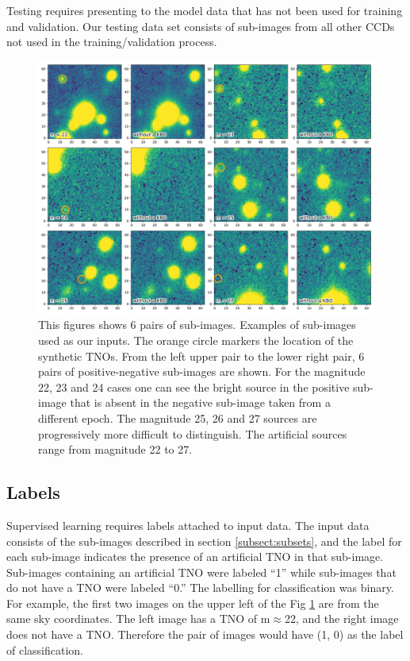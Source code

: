 \documentclass{aastex631}
\begin{document}
Testing requires presenting to the model data that has not been used for training and validation. Our testing data set consists of sub-images from all other CCDs not used in the training/validation process. 

\begin{figure}[ht]
    \centering
    \includegraphics[width=\textwidth,keepaspectratio]{Figures/mag_examples.png}
    \caption{This figures shows 6 pairs of sub-images.
    Examples of sub-images used as our inputs. 
    The orange circle markers the location of the synthetic TNOs.
    From the left upper pair to the lower right pair, 6 pairs of positive-negative sub-images are shown.
    For the magnitude 22, 23 and 24 cases one can see the bright source in the positive sub-image that is absent in the negative sub-image taken from a different epoch.
    The magnitude 25, 26 and 27 sources are progressively more difficult to distinguish. 
    The artificial sources range from magnitude 22 to 27.}
    \label{fig:magexamples}
\end{figure}{}

\subsection{Labels}
\label{subsect:labeling}
Supervised learning requires labels attached to input data. 
The input data consists of the sub-images described in section \ref{subsect:subsets}, and the label for each sub-image indicates the presence of an artificial TNO in that sub-image.  
Sub-images containing an artificial TNO were labeled ``1'' while sub-images that do not have a TNO were labeled ``0.'' 
The labelling for classification was binary.
For example, the first two images on the upper left of the Fig \ref{fig:magexamples} are from the same sky coordinates.
The left image has a TNO of m$\approx$22, and the right image does not have a TNO. 
Therefore the pair of images would have (1, 0) as the label of classification.
\end{document}
